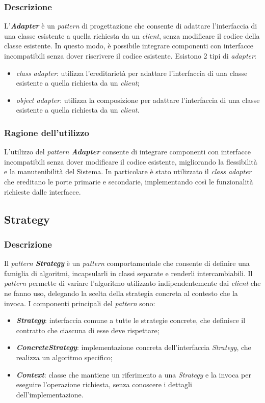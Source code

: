 \subsubsection{Descrizione}
L'\textit{\textbf{Adapter}} è un \textit{pattern} di progettazione che consente di adattare l'interfaccia di una classe esistente a quella richiesta da un \textit{client},
senza modificare il codice della classe esistente. In questo modo, è possibile integrare componenti con interfacce incompatibili senza dover riscrivere 
il codice esistente. Esistono 2 tipi di \textit{adapter}:
\begin{itemize}
    \item \textit{class adapter}: utilizza l'ereditarietà per adattare l'interfaccia di una classe esistente a quella richiesta da un \textit{client};
    \item \textit{object adapter}: utilizza la composizione per adattare l'interfaccia di una classe esistente a quella richiesta da un \textit{client}.
\end{itemize}

\subsubsection{Ragione dell'utilizzo}
L'utilizzo del \textit{pattern \textbf{Adapter}} consente di integrare componenti con interfacce incompatibili senza dover modificare il codice esistente, 
migliorando la flessibilità e la manutenibilità del Sistema. In particolare è stato utilizzato il \textit{class adapter} che ereditano le porte primarie e secondarie, 
implementando così le funzionalità richieste dalle interfacce.

\subsection{Strategy}

\subsubsection{Descrizione}
Il \textit{pattern \textbf{Strategy}} è un \textit{pattern} comportamentale che consente di definire una famiglia di algoritmi, 
incapsularli in classi separate e renderli intercambiabili. Il \textit{pattern} permette di variare l'algoritmo utilizzato 
indipendentemente dai \textit{client} che ne fanno uso, delegando la scelta della strategia concreta al contesto che la invoca. 
I componenti principali del \textit{pattern} sono:
\begin{itemize}
    \item \textit{\textbf{Strategy}}: interfaccia comune a tutte le strategie concrete, che definisce il contratto che ciascuna 
    di esse deve rispettare;
    \item \textit{\textbf{ConcreteStrategy}}: implementazione concreta dell'interfaccia \textit{Strategy}, che realizza un 
    algoritmo specifico;
    \item \textit{\textbf{Context}}: classe che mantiene un riferimento a una \textit{Strategy} e la invoca per eseguire 
    l'operazione richiesta, senza conoscere i dettagli dell'implementazione.
\end{itemize}

